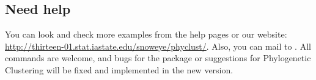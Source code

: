 \subsection[Need help]{Need help}
\label{sec:needhelp}

You can look and check more examples from the help pages or our
website:
\url{http://thirteen-01.stat.iastate.edu/snoweye/phyclust/}.
Also, you can mail to .
All commands are welcome, and bugs for the
 package or suggestions for Phylogenetic Clustering
will be fixed and implemented in the new version.

